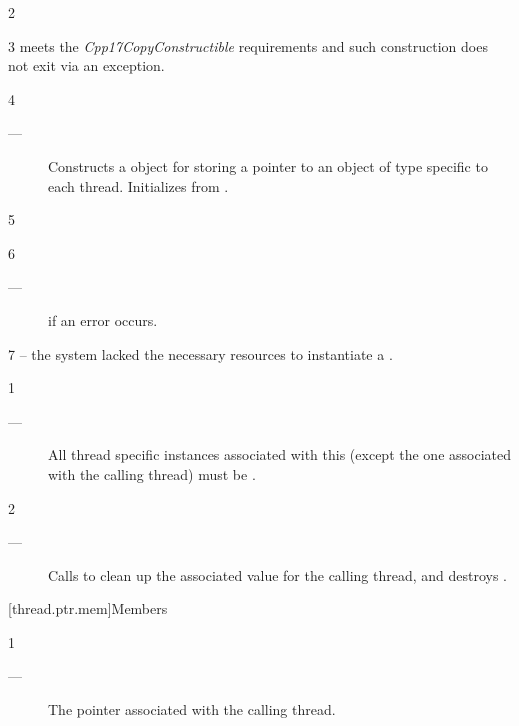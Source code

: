 \documentclass[fontsize=10pt,paper=A4,pagesize,DIV=15]{scrartcl}
\begin{document}
2 \mandates
{}

3 \precond
{} meets the \emph{Cpp17CopyConstructible} requirements and such
construction does not exit via an exception.

4 \effects
\begin{description}
    \item[---] Constructs a  object for storing a
               pointer to an object of type  specific to each thread.
               Initializes  from
               .
\end{description}

5 \postcond
{}

6 \except
\begin{description}
    \item[---]  if an error occurs.
\end{description}

7 \errors
{} -- the system lacked the necessary
resources to instantiate a \tptr.


1 \precond
\begin{description}
    \item[---] All thread specific instances associated with this \tptr
               (except the one associated with the calling thread) must be
               .
\end{description}

2 \effects
\begin{description}
    \item[---] Calls  to clean up the associated value for the
               calling thread, and destroys \this.
\end{description}


[thread.ptr.mem]{Members}


1 \returns
\begin{description}
    \item[---] The pointer associated with the calling thread.
\end{description}
\end{document}
